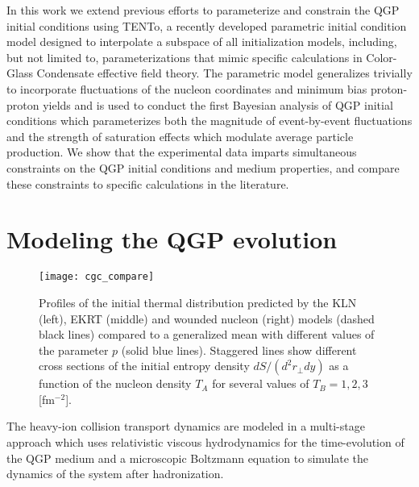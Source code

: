 \documentclass[aps,prc,reprint,amsmath]{revtex4-1}
\newcommand{\trento}{T\raisebox{-0.5ex}{R}ENTo}
\begin{document}
In this work we extend previous efforts to parameterize and constrain the QGP initial conditions using \trento , a recently developed parametric initial condition model designed to interpolate a subspace of all initialization models, including, but not limited to, parameterizations that mimic specific calculations in Color-Glass Condensate effective field theory. The parametric model generalizes trivially to incorporate fluctuations of the nucleon coordinates and minimum bias proton-proton yields and is used to conduct the first Bayesian analysis of QGP initial conditions which parameterizes both the magnitude of event-by-event fluctuations and the strength of saturation effects which modulate average particle production. We show that the experimental data imparts simultaneous constraints on the QGP initial conditions and medium properties, and compare these constraints to specific calculations in the literature.  

\section{Modeling the QGP evolution}

\begin{figure*}
    \texttt{[image: cgc\_compare]}
    \caption{Profiles of the initial thermal distribution predicted by the KLN (left), EKRT (middle) and wounded nucleon (right) models (dashed black lines) compared to a generalized mean with different values of the parameter $p$ (solid blue lines). Staggered lines show different cross sections of the initial entropy density $dS/(d^2r_\perp dy)$ as a function of the nucleon density $T_A$ for several values of $T_B = 1, 2, 3$ [fm$^{-2}$].} 
\end{figure*}

The heavy-ion collision transport dynamics are modeled in a multi-stage approach which uses relativistic viscous hydrodynamics for the time-evolution of the QGP medium and a microscopic Boltzmann equation to simulate the dynamics of the system after hadronization. 
\end{document}
